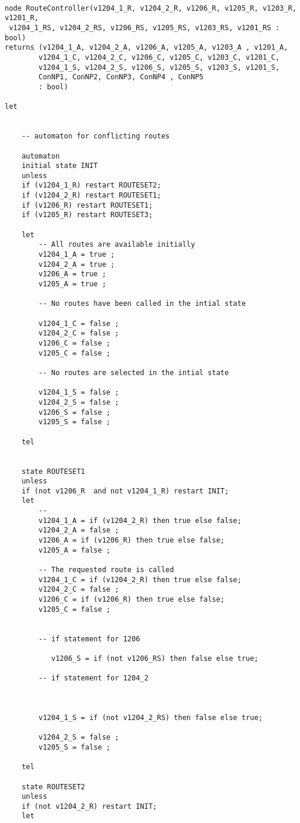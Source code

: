 \begin{verbatim}

node RouteController(v1204_1_R, v1204_2_R, v1206_R, v1205_R, v1203_R, v1201_R,
 v1204_1_RS, v1204_2_RS, v1206_RS, v1205_RS, v1203_RS, v1201_RS : bool)
returns (v1204_1_A, v1204_2_A, v1206_A, v1205_A, v1203_A , v1201_A,
		v1204_1_C, v1204_2_C, v1206_C, v1205_C, v1203_C, v1201_C,
		v1204_1_S, v1204_2_S, v1206_S, v1205_S, v1203_S, v1201_S,
		ConNP1, ConNP2, ConNP3, ConNP4 , ConNP5
		: bool)

let


	-- automaton for conflicting routes

	automaton
	initial state INIT
	unless
    if (v1204_1_R) restart ROUTESET2;
	if (v1204_2_R) restart ROUTESET1;
	if (v1206_R) restart ROUTESET1;
	if (v1205_R) restart ROUTESET3;

	let
		-- All routes are available initially
		v1204_1_A = true ;
		v1204_2_A = true ;
		v1206_A = true ; 
		v1205_A = true ;
		
		-- No routes have been called in the intial state
		
		v1204_1_C = false ;
		v1204_2_C = false ;
		v1206_C = false ; 
		v1205_C = false ;
		
		-- No routes are selected in the intial state
		
		v1204_1_S = false ;
		v1204_2_S = false ;
		v1206_S = false ; 
		v1205_S = false ;
		
	tel
	
	
	state ROUTESET1
	unless
	if (not v1206_R  and not v1204_1_R) restart INIT;
	let
		--
		v1204_1_A = if (v1204_2_R) then true else false;
		v1204_2_A = false ;
		v1206_A = if (v1206_R) then true else false; 
		v1205_A = false ;
		
		-- The requested route is called
		v1204_1_C = if (v1204_2_R) then true else false;
		v1204_2_C = false ; 
		v1206_C = if (v1206_R) then true else false; 
		v1205_C = false ;
		
		
		-- if statement for 1206
		
	       v1206_S = if (not v1206_RS) then false else true;
		
		-- if statement for 1204_2
	
		
				
		v1204_1_S = if (not v1204_2_RS) then false else true;		
		
		v1204_2_S = false ; 
		v1205_S = false ;
	
	tel
	
	state ROUTESET2
	unless
	if (not v1204_2_R) restart INIT;
	let
			

\end{verbatim}
